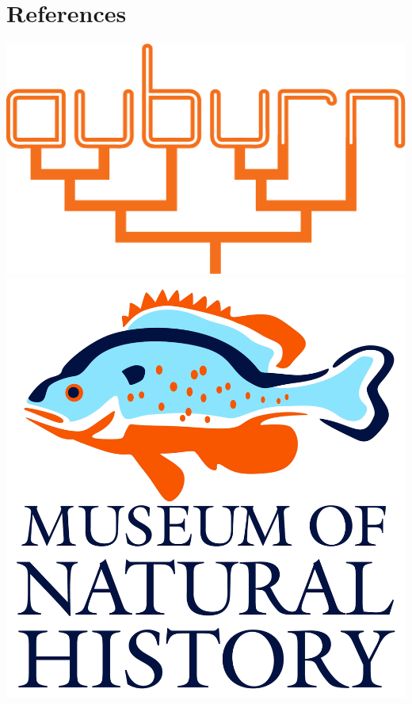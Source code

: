 \documentclass[a0paper,fleqn]{betterposter}
\begin{document}
{\AtNextBibliography{\Huge}
\vspace{-1ex}
\section{References}
\printbibliography[heading=none]

\vfill

\begin{center}
\includegraphics[height=16ex]{../images/auburn-phylo-mtan-2014-orange.pdf}
\hspace{2em}
\includegraphics[height=16ex]{../images/aumnh-crop.png}
\end{center}

}
\end{document}

